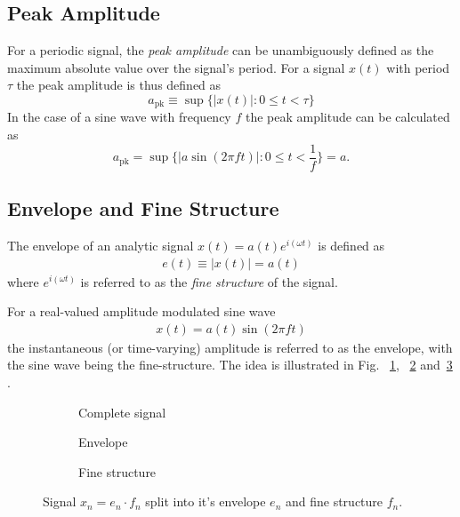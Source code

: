 \documentclass[../main2.tex]{subfiles}
\providecommand{\rootdir}{..}
\begin{document}
\subsection{Peak Amplitude}
For a periodic signal, the \emph{peak amplitude} can be unambiguously defined as the maximum absolute value over the signal's period. For a signal $x(t)$ with period $\tau$ the peak amplitude is thus defined as
\begin{equation}
a_\text{pk} \equiv\sup \{ |x(t)| :  0 \leq t < \tau \}
\end{equation}
In the case of a sine wave with frequency $f$ the peak amplitude can be calculated as
\begin{equation}\label{eq:a_pk}
a_\text{pk} = \sup \{ |a \sin(2 \pi f t) | : 0 \leq t < \frac{1}{f} \} = a.
\end{equation}
\subsection{Envelope and Fine Structure}\label{theory_envelope}
The envelope of an analytic signal $x(t) = a(t)e^{i(\omega t)}$ is defined as \cite{bedrosian1962analytic}
\begin{align}
e(t) \equiv |x(t)| = a(t)
\end{align}
where $e^{i(\omega t)}$ is referred to as the \emph{fine structure} of the signal.

For a real-valued amplitude modulated sine wave
\begin{align}
x(t) = a(t)\sin(2 \pi f t)
\end{align}
the instantaneous (or time-varying) amplitude is referred to as the envelope, with the sine wave being the fine-structure. The idea is illustrated in Fig. ~\ref{fig:signal_env_fine_struct}, ~\ref{fig:signal_env} and~\ref{fig:signal_fine_struct} . 
\begin{figure}
\captionsetup{justification=centering}
\begin{subfigure}{\linewidth}
\centering
\centerline{}
\caption{Complete signal}
\label{fig:signal_env_fine_struct}
\end{subfigure}
\par\bigskip
\begin{subfigure}{.5\linewidth}
\centering

\caption{Envelope}
\label{fig:signal_env}
\end{subfigure}
\begin{subfigure}{.5\linewidth}
\centering

\caption{Fine structure}
\label{fig:signal_fine_struct}
\end{subfigure}%
\caption{Signal $x_n = e_n\cdot f_n$ split into it's envelope $e_n$ and fine structure $f_n$.}
\label{fig:analytic_signal}
\end{figure}
\end{document}
